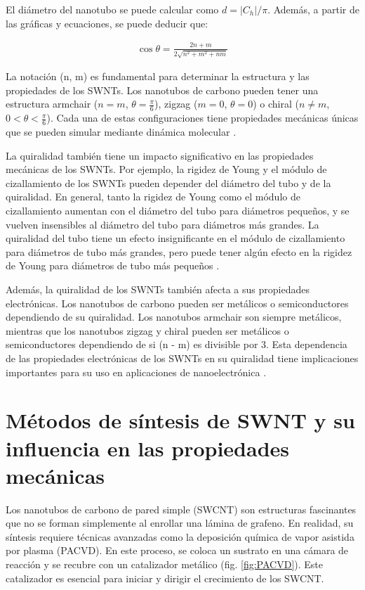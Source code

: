 \documentclass[a4paper]{article}
\begin{document}
El diámetro del nanotubo se puede calcular como \(d=|C_h|/\pi\). Además, a partir de las gráficas y ecuaciones, se puede deducir que:

\begin{align}
    \cos{\theta} = \frac{2n+m}{2\sqrt{n^2 + m^2 + nm}}
\end{align}

La notación (n, m) es fundamental para determinar la estructura y las propiedades de los SWNTs. Los nanotubos de carbono pueden tener una estructura armchair ($n = m$, $\theta=\frac{\pi}{6}$), zigzag ($m=0$, $\theta=0$) o chiral ($n \neq m$, $0<\theta<\frac{\pi}{6}$). Cada una de estas configuraciones tiene propiedades mecánicas únicas que se pueden simular mediante dinámica molecular \cite{avila2008molecular}.

La quiralidad también tiene un impacto significativo en las propiedades mecánicas de los SWNTs. Por ejemplo, la rigidez de Young y el módulo de cizallamiento de los SWNTs pueden depender del diámetro del tubo y de la quiralidad. En general, tanto la rigidez de Young como el módulo de cizallamiento aumentan con el diámetro del tubo para diámetros pequeños, y se vuelven insensibles al diámetro del tubo para diámetros más grandes. La quiralidad del tubo tiene un efecto insignificante en el módulo de cizallamiento para diámetros de tubo más grandes, pero puede tener algún efecto en la rigidez de Young para diámetros de tubo más pequeños \cite{li2003structural}.

Además, la quiralidad de los SWNTs también afecta a sus propiedades electrónicas. Los nanotubos de carbono pueden ser metálicos o semiconductores dependiendo de su quiralidad. Los nanotubos armchair son siempre metálicos, mientras que los nanotubos zigzag y chiral pueden ser metálicos o semiconductores dependiendo de si (n - m) es divisible por 3. Esta dependencia de las propiedades electrónicas de los SWNTs en su quiralidad tiene implicaciones importantes para su uso en aplicaciones de nanoelectrónica \cite{li2003structural}.

\section{Métodos de síntesis de SWNT y su influencia en las propiedades mecánicas}
Los nanotubos de carbono de pared simple (SWCNT) son estructuras fascinantes que no se forman simplemente al enrollar una lámina de grafeno. En realidad, su síntesis requiere técnicas avanzadas como la deposición química de vapor asistida por plasma (PACVD). En este proceso, se coloca un sustrato en una cámara de reacción y se recubre con un catalizador metálico (fig. \ref{fig:PACVD}). Este catalizador es esencial para iniciar y dirigir el crecimiento de los SWCNT.
\end{document}
